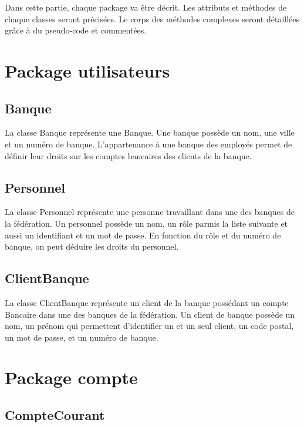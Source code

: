 Dans cette partie, chaque package va être décrit. Les attributs et méthodes de chaque classes seront précisées. Le corps des méthodes complexes seront  détaillées grâce à du pseudo-code et commentées.

\section{Package utilisateurs}

\subsection{Banque}

La classe Banque représente une Banque. Une banque possède un nom, une ville et un numéro de banque.
 L'appartenance à une banque des employés permet de définir leur droits sur les comptes bancaires des clients de
 la banque.

\subsection{Personnel}

La classe Personnel représente une personne travaillant dans une des banques de la fédération.
Un personnel possède un nom, un rôle parmis la liste suivante {\color{orange}{Employe Gerant ou}} {\color{green}{Admin}} et aussi
un identifiant et un mot de passe.
En fonction du rôle et du numéro de banque, on peut déduire les droits du personnel.

\subsection{ClientBanque}

La classe ClientBanque représente un client de la banque possédant un compte Bancaire dans une des banques
de la fédération. Un client de banque possède un nom, un prénom qui permettent d'identifier un et un seul client,
un code postal, un mot de passe, {\color{green}{une adresse email}} {\color{red}{et un numéro de compte}} et un numéro de banque.

\section{Package compte}

\subsection{CompteCourant}

